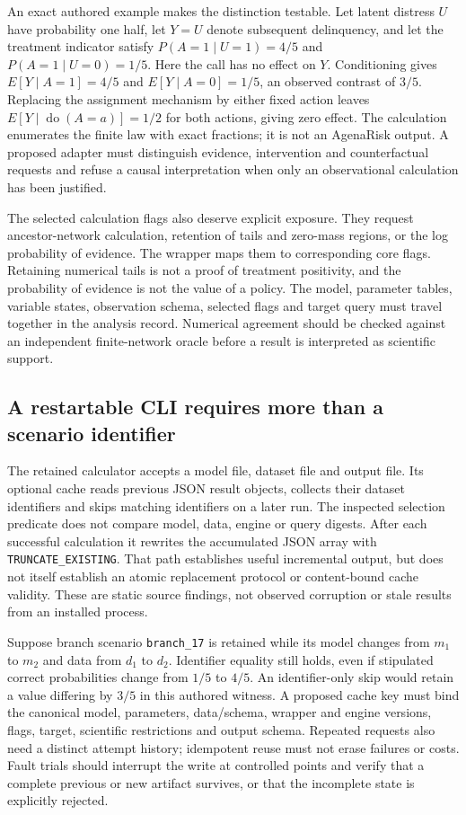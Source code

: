 An exact authored example makes the distinction testable. Let latent distress
$U$ have probability one half, let $Y=U$ denote subsequent delinquency, and
let the treatment indicator satisfy $P(A=1\mid U=1)=4/5$ and
$P(A=1\mid U=0)=1/5$. Here the call has no effect on $Y$. Conditioning gives
$E[Y\mid A=1]=4/5$ and $E[Y\mid A=0]=1/5$, an observed contrast of $3/5$.
Replacing the assignment mechanism by either fixed action leaves
$E[Y\mid\operatorname{do}(A=a)]=1/2$ for both actions, giving zero effect.
The calculation enumerates the finite law with exact fractions; it is not
an AgenaRisk output. A proposed adapter must distinguish evidence, intervention
and counterfactual requests and refuse a causal interpretation when only an
observational calculation has been justified.~\citep{exec25_agena_choice}

The selected calculation flags also deserve explicit exposure. They request
ancestor-network calculation, retention of tails and zero-mass regions, or
the log probability of evidence. The wrapper maps them to corresponding core
flags. Retaining numerical tails is not a proof of treatment positivity, and
the probability of evidence is not the value of a policy. The model, parameter
tables, variable states, observation schema, selected flags and target query
must travel together in the analysis record. Numerical agreement should be
checked against an independent finite-network oracle before a result is
interpreted as scientific support.~\citep{exec25_agena_source,exec25_agena_choice}

\subsection{A restartable CLI requires more than a scenario identifier}
The retained calculator accepts a model file, dataset file and output file.
Its optional cache reads previous JSON result objects, collects their dataset
identifiers and skips matching identifiers on a later run. The inspected
selection predicate does not compare model, data, engine or query digests.
After each successful calculation it rewrites the accumulated JSON array with
\texttt{TRUNCATE\_EXISTING}. That path establishes useful incremental output,
but does not itself establish an atomic replacement protocol or content-bound
cache validity. These are static source findings, not observed corruption or
stale results from an installed process.~\citep{exec25_agena_source}

Suppose branch scenario \texttt{branch\_17} is retained while its model changes
from $m_1$ to $m_2$ and data from $d_1$ to $d_2$. Identifier equality still holds,
even if stipulated correct probabilities change from $1/5$ to $4/5$. An
identifier-only skip would retain a value differing by $3/5$ in this authored
witness. A proposed cache key must bind the canonical model, parameters,
data/schema, wrapper and engine versions, flags, target, scientific restrictions
and output schema. Repeated requests also need a distinct attempt history;
idempotent reuse must not erase failures or costs. Fault trials should interrupt
the write at controlled points and verify that a complete previous or new
artifact survives, or that the incomplete state is explicitly rejected.
\citep{exec25_agena_choice}

